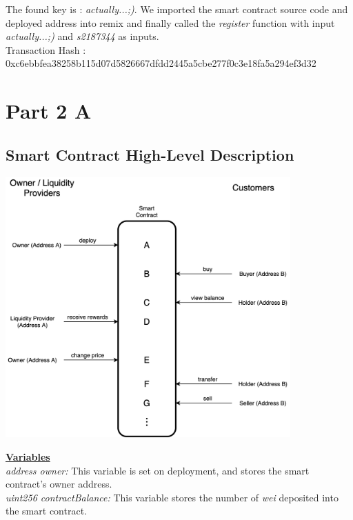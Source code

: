 \documentclass[12pt,a4paper]{article}
\begin{document}
\vspace{5mm}

The found key is : \emph{actually...;)}. We imported the smart contract source
code and deployed address into remix and finally called the \emph{register}
function with input \emph{actually...;)} and \emph{s2187344} as inputs. \\

Transaction Hash : 0xc6ebbfea38258b115d07d5826667dfdd2445a5cbe277f0c3e18fa5a294ef3d32

\section*{Part 2 A}

\subsection*{Smart Contract High-Level Description}

\begin{center}
    \includegraphics[height=10cm]{execution_flow.png}
\end{center}

\textbf{\underline{Variables}} \\

\emph{address owner:} This variable is set on deployment, and stores the smart
contract's owner address.\\

\emph{uint256 contractBalance:} This variable stores the number of \emph{wei} deposited
into the smart contract.\\
\end{document}
